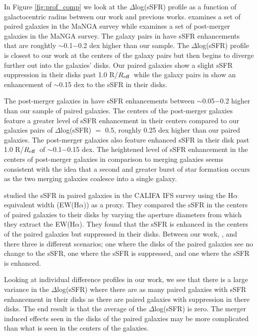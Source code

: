 \documentclass[iop,revtex4,twocolumn,apj,numberedappendix,appendixfloats]{emulateapj}
\newcommand{\reff}{$R_{\rm eff}$}
\newcommand{\ewha}{EW(H$\alpha$)}
\begin{document}
In Figure \ref{fig:prof_comp} we look at the $\Delta$log(sSFR) profile as a function of galactocentric radius between our work and previous works. \citet{Pan:2019} examines a set of paired galaxies in the MaNGA survey while \citet{Thorp:2019} examines a set of post-merger galaxies in the MaNGA survey. The galaxy pairs in \citet{Pan:2019} have sSFR enhancements that are roughtly $\sim$0.1$-$0.2 dex higher than our sample. The $\Delta$log(sSFR) profile is closest to our work at the centers of the galaxy pairs but then begins to diverge further out into the galaxies' disks. Our paired galaxies show a slight sSFR suppression in their disks past 1.0 R/\reff\ while the galaxy pairs in \citet{Pan:2019} show an enhancement of $\sim$0.15 dex to the sSFR in their disks. 

The post-merger galaxies in \citet{Thorp:2019} have sSFR enhancements between $\sim$0.05$-$0.2 higher than our sample of paired galaxies. The centers of the post-merger galaxies feature a greater level of sSFR enhancement in their centers compared to our galaxies pairs of $\Delta$log(sSFR) $=$ 0.5, roughly 0.25 dex higher than our paired galaxies. The post-merger galaxies also feature enhanced sSFR in their disk past 1.0 R/\reff\ of $\sim$0.1$-$0.15 dex. The heightened level of sSFR enhancement in the centers of post-merger galaxies in comparison to merging galaxies seems consistent with the idea that a second and greater burst of star formation occurs as the two merging galaxies coalesce into a single galaxy. 

\citet{Barrera-Ballesteros:2015} studied the sSFR in paired galaxies in the CALIFA IFS survey using the H$\alpha$ equivalent width (\ewha) as a proxy. They compared the sSFR in the centers of paired galaxies to their disks by varying the aperture diameters from which they extract the \ewha. They found that the sSFR is enhanced in the centers of the paired galaxies but suppressed in their disks. Between our work, \citet{Barrera-Ballesteros:2015}, and \citet{Pan:2019} there three is different scenarios; one where the disks of the paired galaxies see no change to the sSFR, one where the sSFR is suppressed, and one where the sSFR is enhanced. 

Looking at individual difference profiles in our work, we see that there is a large variance in the $\Delta$log(sSFR) where there are as many paired galaxies with sSFR enhancement in their disks as there are paired galaxies with suppression in there disks. The end result is that the average of the $\Delta$log(sSFR) is zero. The merger induced effects seen in the disks of the paired galaxies may be more complicated than what is seen in the centers of the galaxies. 
\end{document}
